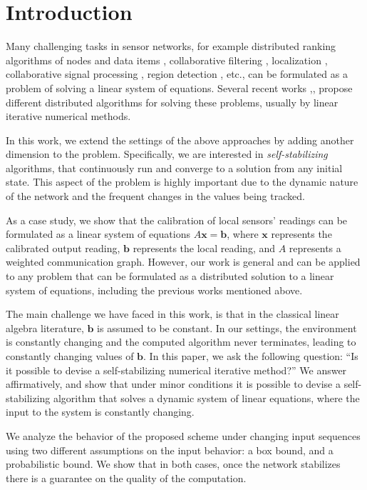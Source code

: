\documentclass[preprint,12pt]{elsarticle}
\newcommand{\xx}{\mathbf{x}}
\newcommand{\bb}{\mathbf{b}}
\begin{document}
\section{Introduction}
Many challenging tasks in sensor networks, for example distributed ranking algorithms
of nodes and data items \cite{PPNA08}, collaborative filtering \cite{KorenCF},
localization \cite{SensorLocalization}, collaborative signal
processing \cite{SignalProcessing}, region detection
\cite{RegionDetection}, etc., can be formulated as a problem of solving a linear system of
equations. Several recent works \cite{SensorLocalization},\cite{SignalProcessing},\cite{RegionDetection} propose different distributed
algorithms for solving these problems, usually by linear iterative numerical
methods.

In this work, we extend the settings of the above approaches by
adding another dimension to the problem. Specifically, we are
interested in {\em self-stabilizing} algorithms, that continuously run
and converge to a solution from any initial
state. This aspect of the problem is highly important due to the dynamic
nature of the network and the frequent changes in the
values being tracked.

As a case study, we show that the calibration of local sensors' readings can be formulated as a
linear system of equations $A\xx = \bb$, where $\xx$ represents
the calibrated output reading, $\bb$ represents the local reading, and $A$
represents a weighted communication graph. However, our work is general and
can be applied to any problem that can be formulated as a distributed solution to a
linear system of equations, including the previous works mentioned above.

The main challenge we have faced in this work, is that in the
classical linear algebra literature, $\bb$ is assumed to be constant.
In our settings, the environment is constantly changing and the
computed algorithm never terminates, leading to constantly
changing values of $\bb$. In this paper, we ask the following question: ``Is it possible to
devise a self-stabilizing numerical iterative method?'' We answer
affirmatively, and show that under minor conditions it is possible
to devise a self-stabilizing algorithm that solves a dynamic
system of linear equations, where the input to the system is
constantly changing.

We analyze the behavior of the proposed scheme under changing input sequences
using two different assumptions on the input behavior: a box bound, and a probabilistic bound.
We show that in both cases, once the network stabilizes there is a guarantee on
the quality of the computation.
\end{document}
